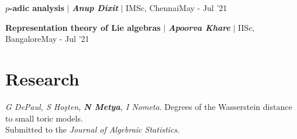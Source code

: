 \resumeProjectHeading
{\textbf{$p$-adic analysis} $|$ \textbf{\emph{Anup Dixit}} $|$ IMSc, Chennai}{May - Jul '21}
\resumeItemListStart
{}
\resumeItemListEnd 
\vspace{\gap}

\resumeProjectHeading
{\textbf{Representation theory of Lie algebras} $|$ \textbf{\emph{Apoorva Khare }}$|$ IISc, Bangalore}{May - Jul '21}
\resumeItemListStart
{}
\resumeItemListEnd 
\resumeSubHeadingListEnd


\section{Research}





\begin{etaremune}
\item \emph{\color{grey}G DePaul, S Ho\c{s}ten, \textbf{N Metya}, I Nometa}. Degrees of the Wasserstein distance to small toric models. \\Submitted to the \textit{Journal of Algebraic Statistics}.
\end{etaremune}



